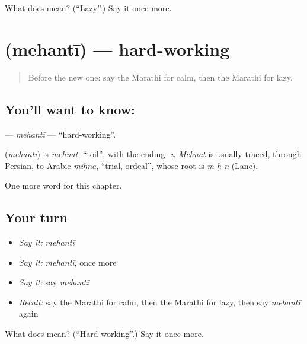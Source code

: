 \begin{tcolorbox}[breakable,colback=teal!4,colframe=teal!35!black,title={Before you move on}]
What does  mean? (\textquotedblleft{}Lazy\textquotedblright{}.) Say it once more.
\end{tcolorbox}
\section[\texorpdfstring{\mr{मेहनती} (mehantī)}{मेहनती (mehantī)}]{ (mehantī) — hard-working}

\label{lesson:MR-C150-mehanti}



\begin{quote}
Before the new one: say the Marathi for calm, then the Marathi for lazy.
\end{quote}

\subsection*{You'll want to know: }
\textbf{} — \emph{mehantī} — \textquotedblleft{}hard-working\textquotedblright{}.

\begin{cousinweb}
\textbf{} (\emph{mehantī}) is \emph{mehnat}, \textquotedblleft{}toil\textquotedblright{}, with the ending \emph{-ī}. \emph{Mehnat} is usually traced, through Persian, to Arabic \emph{miḥna}, \textquotedblleft{}trial, ordeal\textquotedblright{}, whose root is \emph{m-ḥ-n} (Lane).
\end{cousinweb}

\begin{grammarlens}[title={What you've built}]
One more word for this chapter.
\end{grammarlens}

\subsection*{Your turn}
\begin{itemize}
\raggedright
  \item \emph{Say it:} \emph{mehantī}
  \item \emph{Say it:} \emph{mehantī}, once more
  \item \emph{Say it:} say \emph{mehantī}
  \item \emph{Recall:} say the Marathi for calm, then the Marathi for lazy, then say \emph{mehantī} again
\end{itemize}

\begin{tcolorbox}[breakable,colback=teal!4,colframe=teal!35!black,title={Before you move on}]
What does  mean? (\textquotedblleft{}Hard-working\textquotedblright{}.) Say it once more.
\end{tcolorbox}
